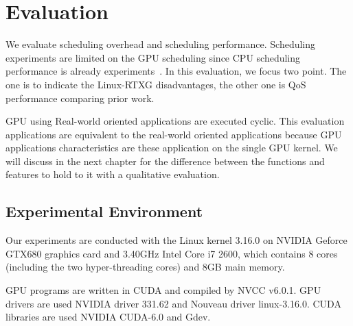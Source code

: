 \section{Evaluation}\label{sec:evaluation}
We evaluate scheduling overhead and scheduling performance.
Scheduling experiments are limited on the GPU scheduling since CPU scheduling performance is already experiments~\cite{kato:resch}.
In this evaluation, we focus two point.
The one is to indicate the Linux-RTXG disadvantages,
the other one is QoS performance comparing prior work. 


GPU using Real-world oriented applications\cite{hirabayashi:cpsna2013,tokamak} are executed cyclic.
This evaluation applications are equivalent to the real-world oriented applications
because GPU applications characteristics are these application on the single GPU kernel.
We will discuss in the next chapter for the difference between the functions and features to hold to it with a qualitative evaluation.



\subsection{Experimental Environment}
Our experiments are conducted with the Linux kernel 3.16.0 on NVIDIA Geforce GTX680 graphics card and 3.40GHz Intel Core i7 2600, which contains 8 cores (including the two hyper-threading cores) and 8GB main memory.

GPU programs are written in CUDA and compiled by NVCC v6.0.1.
GPU drivers are used NVIDIA driver 331.62 and Nouveau driver linux-3.16.0.
CUDA libraries are used NVIDIA CUDA-6.0 and Gdev.

